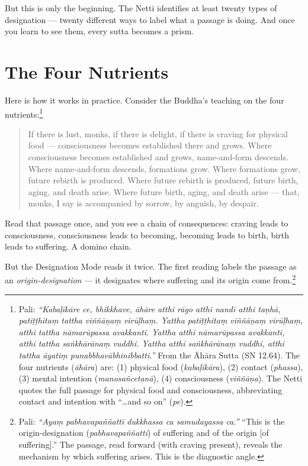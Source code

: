 But this is only the beginning. The Netti identifies at least twenty types of designation --- twenty different ways to label what a passage is doing. And once you learn to see them, every sutta becomes a prism.

\section*{The Four Nutrients}

Here is how it works in practice. Consider the Buddha's teaching on the four nutrients:\footnote{Pali: \textit{``Kabaḷīkāre ce, bhikkhave, āhāre atthi rāgo atthi nandī atthi taṇhā, patiṭṭhitaṃ tattha viññāṇaṃ virūḷhaṃ. Yattha patiṭṭhitaṃ viññāṇaṃ virūḷhaṃ, atthi tattha nāmarūpassa avakkanti. Yattha atthi nāmarūpassa avakkanti, atthi tattha saṅkhārānaṃ vuddhi. Yattha atthi saṅkhārānaṃ vuddhi, atthi tattha āyatiṃ punabbhavābhinibbatti.''} From the Āhāra Sutta (SN 12.64). The four nutrients (\textit{āhāra}) are: (1) physical food (\textit{kabaḷīkāra}), (2) contact (\textit{phassa}), (3) mental intention (\textit{manosañcetanā}), (4) consciousness (\textit{viññāṇa}). The Netti quotes the full passage for physical food and consciousness, abbreviating contact and intention with ``\ldots and so on'' (\textit{pe}).}

\begin{quote}
If there is lust, monks, if there is delight, if there is craving for physical food --- consciousness becomes established there and grows. Where consciousness becomes established and grows, name-and-form descends. Where name-and-form descends, formations grow. Where formations grow, future rebirth is produced. Where future rebirth is produced, future birth, aging, and death arise. Where future birth, aging, and death arise --- that, monks, I say is accompanied by sorrow, by anguish, by despair.
\end{quote}

Read that passage once, and you see a chain of consequences: craving leads to consciousness, consciousness leads to becoming, becoming leads to birth, birth leads to suffering. A domino chain.

But the Designation Mode reads it twice. The first reading labels the passage as an \textit{origin-designation} --- it designates where suffering and its origin come from.\footnote{Pali: \textit{``Ayaṃ pabhavapaññatti dukkhassa ca samudayassa ca.''} ``This is the origin-designation (\textit{pabhavapaññatti}) of suffering and of the origin [of suffering].'' The passage, read forward (with craving present), reveals the mechanism by which suffering arises. This is the diagnostic angle.}

